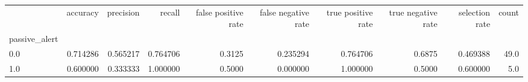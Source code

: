 \begin{tabular}{lrrrrrrrrr}
\toprule
{} &  accuracy &  precision &    recall &  false positive rate &  false negative rate &  true positive rate &  true negative rate &  selection rate &  count \\
passive\_alert &           &            &           &                      &                      &                     &                     &                 &        \\
\midrule
0.0           &  0.714286 &   0.565217 &  0.764706 &               0.3125 &             0.235294 &            0.764706 &              0.6875 &        0.469388 &   49.0 \\
1.0           &  0.600000 &   0.333333 &  1.000000 &               0.5000 &             0.000000 &            1.000000 &              0.5000 &        0.600000 &    5.0 \\
\bottomrule
\end{tabular}
